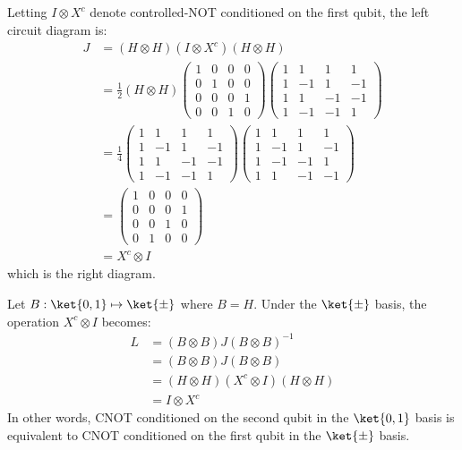 \begingroup
%
\par Letting $I \otimes X^c$ denote controlled-NOT conditioned on the first qubit, the left circuit diagram is:
%
\begin{align}
J &= \left( H \otimes H \right) \left( I \otimes X^c \right) \left( H \otimes H \right) \\
&= \frac12 \left( H \otimes H \right) \begin{pmatrix} 1 & 0 & 0 & 0 \\ 0 & 1 & 0 & 0 \\ 0 & 0 & 0 & 1 \\ 0 & 0 & 1 & 0 \end{pmatrix} \begin{pmatrix} 1 & 1 & 1 & 1 \\ 1 & -1 & 1 & -1 \\ 1 & 1 & -1 & -1 \\ 1 & -1 & -1 & 1 \end{pmatrix} \\
&= \frac14 \begin{pmatrix} 1 & 1 & 1 & 1 \\ 1 & -1 & 1 & -1 \\ 1 & 1 & -1 & -1 \\ 1 & -1 & -1 & 1 \end{pmatrix} \begin{pmatrix} 1 & 1 & 1 & 1 \\ 1 & -1 & 1 & -1 \\ 1 & -1 & -1 & 1 \\ 1 & 1 & -1 & -1 \end{pmatrix} \\
&= \begin{pmatrix} 1 & 0 & 0 & 0 \\ 0 & 0 & 0 & 1 \\ 0 & 0 & 1 & 0 \\ 0 & 1 & 0 & 0 \end{pmatrix} \\
&= X^c \otimes I
\end{align}
%
which is the right diagram.
%
\par Let $B : \ket{0,1} \mapsto \ket{\pm}$ where $B = H$.
%
Under the $\ket{\pm}$ basis, the operation $X^c \otimes I$ becomes:
%
\begin{align}
L &= \left( B \otimes B \right) J \left( B \otimes B \right)^{-1} \\
&= \left( B \otimes B \right) J \left( B \otimes B \right) \\
&= \left( H \otimes H \right) \left( X^c \otimes I \right) \left( H \otimes H \right) \\
&= I \otimes X^c
\end{align}
%
In other words, CNOT conditioned on the second qubit in the $\ket{0, 1}$ basis is equivalent to CNOT conditioned on the first qubit in the $\ket{\pm}$ basis.
%
\endgroup
